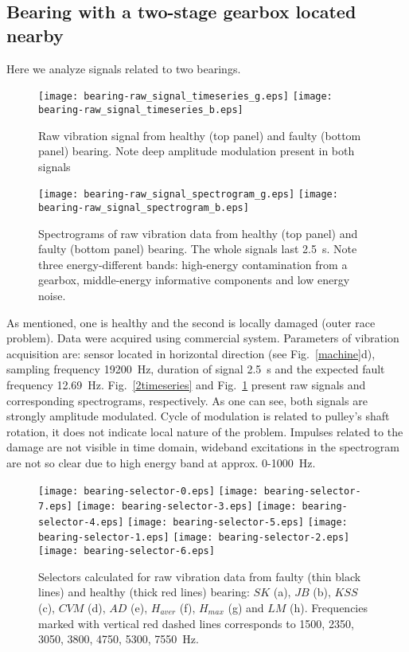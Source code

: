 \documentclass[3p,times]{elsarticle}
\begin{document}
\subsection{Bearing with a two-stage gearbox located nearby}\label{bearing}
Here we analyze signals related to two bearings.
\begin{figure}[!ht]
\begin{center}
\texttt{[image: bearing-raw\_signal\_timeseries\_g.eps]}
\texttt{[image: bearing-raw\_signal\_timeseries\_b.eps]}
\caption{Raw vibration signal from healthy (top panel) and faulty (bottom panel) bearing. Note deep amplitude modulation present in both signals}\label{2timeseries}
\texttt{[image: bearing-raw\_signal\_spectrogram\_g.eps]}
\texttt{[image: bearing-raw\_signal\_spectrogram\_b.eps]}
\caption{Spectrograms of raw vibration data from healthy (top panel) and faulty (bottom panel) bearing. The whole signals last 2.5~s. Note three energy-different bands: high-energy contamination from a gearbox, middle-energy informative components and low energy noise.}
\label{2spectrograms}
\end{center}
\end{figure}
As mentioned, one is healthy and the second is locally damaged (outer race problem). Data were acquired using commercial system.
Parameters of vibration acquisition are: sensor located in horizontal direction (see Fig.~\ref{machine}d), sampling frequency 19200~Hz, duration of signal 2.5~s and the expected fault frequency 12.69~Hz. Fig.~\ref{2timeseries} and Fig.~\ref{2spectrograms} present raw signals and corresponding spectrograms, respectively. As one can see, both signals are strongly amplitude modulated. Cycle of modulation is related to pulley's shaft rotation, it does not indicate local nature of the problem. Impulses related to the damage are not visible in time domain, wideband excitations in the spectrogram are not so clear due to high energy band at approx. 0-1000~Hz.\\
\begin{figure}[t]
\begin{center}
\texttt{[image: bearing-selector-0.eps]}
\texttt{[image: bearing-selector-7.eps]}
\texttt{[image: bearing-selector-3.eps]}
\texttt{[image: bearing-selector-4.eps]}
\texttt{[image: bearing-selector-5.eps]}
\texttt{[image: bearing-selector-1.eps]}
\texttt{[image: bearing-selector-2.eps]}
\texttt{[image: bearing-selector-6.eps]}
\caption{Selectors calculated for raw vibration data from faulty (thin black lines) and healthy (thick red lines) bearing: $SK$ (a), $JB$ (b), $KSS$ (c), $CVM$ (d), $AD$ (e), $H_{aver}$ (f), $H_{max}$ (g) and $LM$ (h). Frequencies marked with vertical red dashed lines corresponds to 1500, 2350, 3050, 3800, 4750, 5300, 7550~Hz.}
\label{2selectors}
\end{center}
\end{figure}
\end{document}
